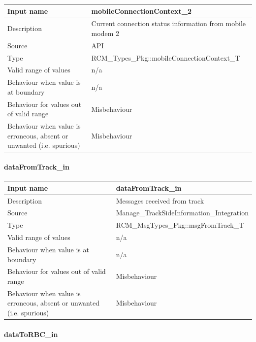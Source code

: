\begin{longtable}{p{}p{}}
	\toprule
	Input name				& mobileConnectionContext\_2 \\
	\midrule
	Description				& Current connection status information from mobile modem 2 \\
	\midrule
	Source					& API \\ 
	\midrule
	Type					& RCM\_Types\_Pkg::mobileConnectionContext\_T \\
	\midrule
	Valid range of values	& n/a \\
	\midrule
	Behaviour when value is at boundary	& n/a \\
	\midrule
	Behaviour for values out of valid range	& Misbehaviour \\
	\midrule
	Behaviour when value is erroneous, absent or unwanted (i.e. spurious) & Misbehaviour \\
	\bottomrule
\end{longtable}

\paragraph{dataFromTrack\_in}

\begin{longtable}{p{}p{}}
	\toprule
	Input name				& dataFromTrack\_in \\
	\midrule
	Description				& Messages received from track \\
	\midrule
	Source					&  Manage\_TrackSideInformation\_Integration \\ 
	\midrule
	Type					& RCM\_MsgTypes\_Pkg::msgFromTrack\_T \\
	\midrule
	Valid range of values	& n/a \\
	\midrule
	Behaviour when value is at boundary	& n/a \\
	\midrule
	Behaviour for values out of valid range	& Misbehaviour \\
	\midrule
	Behaviour when value is erroneous, absent or unwanted (i.e. spurious) & Misbehaviour \\
	\bottomrule
\end{longtable}

\paragraph{dataToRBC\_in}

